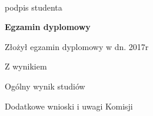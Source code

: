   \indent

  \hfill\parbox{15em}{{\small\dotfill}\\[-.3ex]
  \centerline{\footnotesize podpis studenta}}\par
  \vspace{2\baselineskip}
  \begin{center}
  {\large\bfseries Egzamin dyplomowy} \par\bigskip\bigskip
  \end{center}
  \par\noindent
  Złożył egzamin dyplomowy w dn. \dotfill 2017r
  \par\noindent
  Z wynikiem \dotfill
  \par\noindent
  Ogólny wynik studiów \dotfill
  \par\noindent
  Dodatkowe wnioski i uwagi Komisji \dotfill
  \par\noindent
  \dotfill